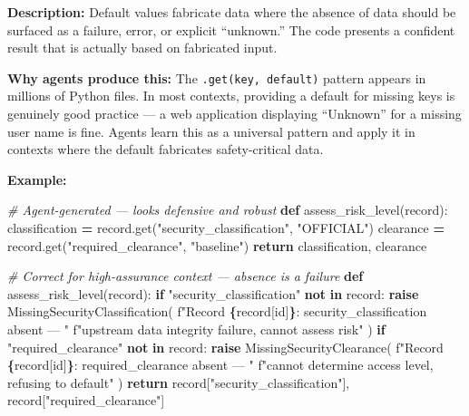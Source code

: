 \documentclass[a4paper,11pt]{report}
\newenvironment{Shaded}{\begin{snugshade}}{\end{snugshade}}
\newcommand{\CommentTok}[1]{\textcolor[rgb]{0.56,0.35,0.01}{\textit{#1}}}
\newcommand{\ControlFlowTok}[1]{\textcolor[rgb]{0.13,0.29,0.53}{\textbf{#1}}}
\newcommand{\KeywordTok}[1]{\textcolor[rgb]{0.13,0.29,0.53}{\textbf{#1}}}
\newcommand{\NormalTok}[1]{#1}
\newcommand{\OperatorTok}[1]{\textcolor[rgb]{0.81,0.36,0.00}{\textbf{#1}}}
\newcommand{\SpecialCharTok}[1]{\textcolor[rgb]{0.81,0.36,0.00}{\textbf{#1}}}
\newcommand{\SpecialStringTok}[1]{\textcolor[rgb]{0.31,0.60,0.02}{#1}}
\newcommand{\StringTok}[1]{\textcolor[rgb]{0.31,0.60,0.02}{#1}}
\begin{document}
\textbf{Description:} Default values fabricate data where the absence of
data should be surfaced as a failure, error, or explicit ``unknown.''
The code presents a confident result that is actually based on
fabricated input.

\textbf{Why agents produce this:} The \texttt{.get(key,\ default)}
pattern appears in millions of Python files. In most contexts, providing
a default for missing keys is genuinely good practice --- a web
application displaying ``Unknown'' for a missing user name is fine.
Agents learn this as a universal pattern and apply it in contexts where
the default fabricates safety-critical data.

\textbf{Example:}

\begin{Shaded}
\begin{Highlighting}[]
\CommentTok{\# Agent{-}generated — looks defensive and robust}
\KeywordTok{def}\NormalTok{ assess\_risk\_level(record):}
\NormalTok{    classification }\OperatorTok{=}\NormalTok{ record.get(}\StringTok{"security\_classification"}\NormalTok{, }\StringTok{"OFFICIAL"}\NormalTok{)}
\NormalTok{    clearance }\OperatorTok{=}\NormalTok{ record.get(}\StringTok{"required\_clearance"}\NormalTok{, }\StringTok{"baseline"}\NormalTok{)}
    \ControlFlowTok{return}\NormalTok{ classification, clearance}

\CommentTok{\# Correct for high{-}assurance context — absence is a failure}
\KeywordTok{def}\NormalTok{ assess\_risk\_level(record):}
    \ControlFlowTok{if} \StringTok{"security\_classification"} \KeywordTok{not} \KeywordTok{in}\NormalTok{ record:}
        \ControlFlowTok{raise}\NormalTok{ MissingSecurityClassification(}
            \SpecialStringTok{f"Record }\SpecialCharTok{\{}\NormalTok{record[}\StringTok{\textquotesingle{}id\textquotesingle{}}\NormalTok{]}\SpecialCharTok{\}}\SpecialStringTok{: security\_classification absent — "}
            \SpecialStringTok{f"upstream data integrity failure, cannot assess risk"}
\NormalTok{        )}
    \ControlFlowTok{if} \StringTok{"required\_clearance"} \KeywordTok{not} \KeywordTok{in}\NormalTok{ record:}
        \ControlFlowTok{raise}\NormalTok{ MissingSecurityClearance(}
            \SpecialStringTok{f"Record }\SpecialCharTok{\{}\NormalTok{record[}\StringTok{\textquotesingle{}id\textquotesingle{}}\NormalTok{]}\SpecialCharTok{\}}\SpecialStringTok{: required\_clearance absent — "}
            \SpecialStringTok{f"cannot determine access level, refusing to default"}
\NormalTok{        )}
    \ControlFlowTok{return}\NormalTok{ record[}\StringTok{"security\_classification"}\NormalTok{], record[}\StringTok{"required\_clearance"}\NormalTok{]}
\end{Highlighting}
\end{Shaded}
\end{document}
